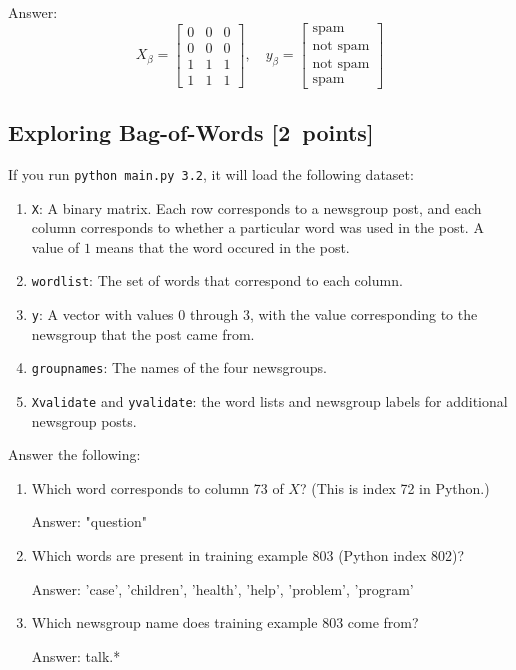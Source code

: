 \documentclass{article}
\newcommand{\blu}[1]{{\textcolor{blu}{#1}}}
\newcommand{\gre}[1]{\textcolor{gre}{#1}}
\newcommand\ans[1]{\par\gre{Answer: #1}}
\newenvironment{answer}{\par\begingroup\color{gre}Answer: }{\endgroup}
\let\ask\blu
\newcommand\pts[1]{\textcolor{pointscolour}{[#1~points]}}
\begin{document}
    \begin{answer}
        \[
        X_\beta = \begin{bmatrix}
            0 & 0 & 0\\
            0 & 0 & 0\\
            1 & 1 & 1\\
            1 & 1 & 1
        \end{bmatrix},
        \quad y_\beta = \begin{bmatrix}
            \text{spam}\\
            \text{not spam}\\
            \text{not spam}\\
            \text{spam}
        \end{bmatrix}
        \]
    \end{answer}

    \subsection{Exploring Bag-of-Words \pts{2}}

    If you run \texttt{python main.py 3.2}, it will load the following dataset:
    \begin{enumerate}
        \item \texttt{X}: A binary matrix. Each row corresponds to a newsgroup post, and each column corresponds to whether a particular word was used in the post. A value of $1$ means that the word occured in the post.
        \item \texttt{wordlist}: The set of words that correspond to each column.
        \item \texttt{y}: A vector with values $0$ through $3$, with the value corresponding to the newsgroup that the post came from.
        \item \texttt{groupnames}: The names of the four newsgroups.
        \item \texttt{Xvalidate} and \texttt{yvalidate}: the word lists and newsgroup labels for additional newsgroup posts.
    \end{enumerate}
    \ask{Answer the following}:
    \begin{enumerate}
        \item Which word corresponds to column 73 of $X$? (This is index 72 in Python.)
        \ans{"question"}
        \item Which words are present in training example 803 (Python index 802)?
        \ans{'case', 'children', 'health', 'help', 'problem', 'program'}
        \item Which newsgroup name does training example 803 come from?
        \ans{talk.*}
    \end{enumerate}
\end{document}
